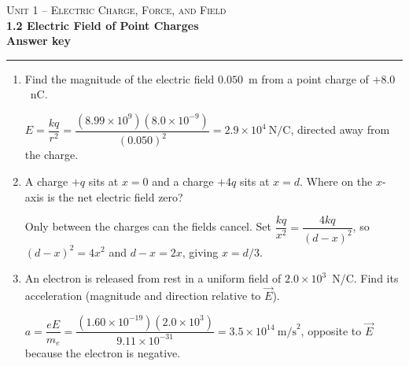 \documentclass[11pt,letterpaper]{article}
\begin{document}
{\small\textsc{Unit 1 -- Electric Charge, Force, and Field}}\\[2pt]{\Large\bfseries 1.2 Electric Field of Point Charges}\\[8pt]\textbf{Answer key}\\[4pt]\hrule\vspace{10pt}{\small\itshape Placeholder worksheet for the site prototype. Free for classroom use.}\vspace{6pt}
\begin{enumerate}[leftmargin=*,itemsep=10pt]
\item Find the magnitude of the electric field $0.050$~m from a point charge of $+8.0$~nC.
\begin{answer}$E = \dfrac{kq}{r^2} = \dfrac{(8.99\times10^{9})(8.0\times10^{-9})}{(0.050)^2} = 2.9\times10^{4}\ \text{N/C}$, directed away from the charge.\end{answer}
\item A charge $+q$ sits at $x=0$ and a charge $+4q$ sits at $x=d$. Where on the $x$-axis is the net electric field zero?
\begin{answer}Only between the charges can the fields cancel. Set $\dfrac{kq}{x^2} = \dfrac{4kq}{(d-x)^2}$, so $(d-x)^2 = 4x^2$ and $d - x = 2x$, giving $x = d/3$.\end{answer}
\item An electron is released from rest in a uniform field of $2.0\times10^{3}$~N/C. Find its acceleration (magnitude and direction relative to $\vec{E}$).
\begin{answer}$a = \dfrac{eE}{m_e} = \dfrac{(1.60\times10^{-19})(2.0\times10^{3})}{9.11\times10^{-31}} = 3.5\times10^{14}\ \text{m/s}^2$, opposite to $\vec{E}$ because the electron is negative.\end{answer}
\end{enumerate}
\end{document}
